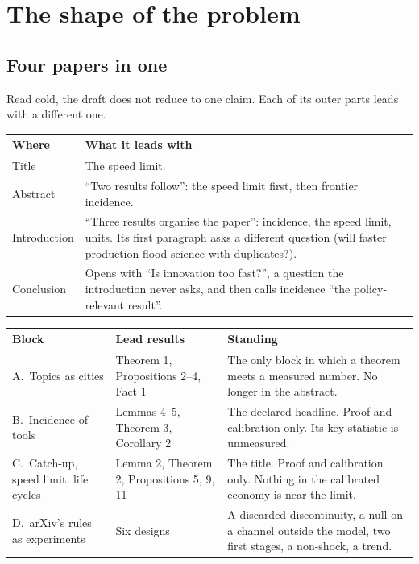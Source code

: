 \section{The shape of the problem}\label{sec:crit-structure}

\subsection{Four papers in one}

Read cold, the draft does not reduce to one claim. Each of its outer parts leads with a different one.

\begin{center}\small
\begin{tabularx}{\textwidth}{@{}P{1.2in}L@{}}
\toprule
Where & What it leads with \\
\midrule
Title & The speed limit. \\
Abstract & ``Two results follow'': the speed limit first, then frontier incidence. \\
Introduction & ``Three results organise the paper'': incidence, the speed limit, units. Its first paragraph asks a different question (will faster production flood science with duplicates?). \\
Conclusion & Opens with ``Is innovation too fast?'', a question the introduction never asks, and then calls incidence ``the policy-relevant result''. \\
\bottomrule
\end{tabularx}
\end{center}

\begin{center}\small
\begin{tabularx}{\textwidth}{@{}P{1.55in}P{1.55in}L@{}}
\toprule
Block & Lead results & Standing \\
\midrule
A.\ Topics as cities & Theorem 1, Propositions 2--4, Fact 1 & The only block in which a theorem meets a measured number. No longer in the abstract. \\
B.\ Incidence of tools & Lemmas 4--5, Theorem 3, Corollary 2 & The declared headline. Proof and calibration only. Its key statistic is unmeasured. \\
C.\ Catch-up, speed limit, life cycles & Lemma 2, Theorem 2, Propositions 5, 9, 11 & The title. Proof and calibration only. Nothing in the calibrated economy is near the limit. \\
D.\ arXiv's rules as experiments & Six designs & A discarded discontinuity, a null on a channel outside the model, two first stages, a non-shock, a trend. \\
\bottomrule
\end{tabularx}
\end{center}

